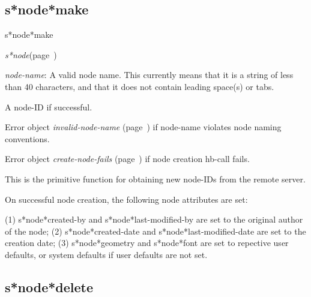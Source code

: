 \subsection{s*node*make}
\label{s*node*make}

\begin{description}
\item [Name:]  s*node*make

\item [Class:] {\sl s*node}\hfill(page~\pageref{s*node})

\item [Parameters:]
\item {\sl node-name}:  
A valid node name. This currently means that it is a
string of less than 40 characters, and that it does
not contain leading space(s) or tabs.
  

\item [Return-value:] 
A node-ID if successful.

Error object {\sl invalid-node-name} (page~\pageref{invalid-node-name}) if node-name
violates node naming conventions.

Error object {\sl create-node-fails} (page~\pageref{create-node-fails}) if node
creation hb-call fails.

\item [Description:]
This is the primitive function for obtaining
new node-IDs from the remote server.

On successful node creation, the following node
attributes are set:

(1) s*node*created-by and s*node*last-modified-by are
set to the original author of the node; (2)
s*node*created-date and s*node*last-modified-date are
set to the creation date; (3) s*node*geometry and
s*node*font are set to repective user defaults, or
system defaults if user defaults are not set.

\item [Public:]





\end{description}
\horizontalline

\subsection{s*node*delete}
\label{s*node*delete}

